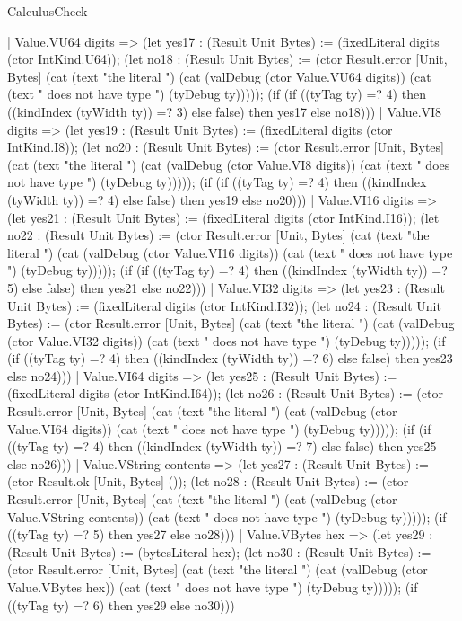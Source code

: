 \begin{lexlean}{CalculusCheck}
\begin{semanticmodule}
{    | Value.VU64 digits => (let yes17 : (Result Unit Bytes) := (fixedLiteral digits (ctor IntKind.U64)); (let no18 : (Result Unit Bytes) := (ctor Result.error [Unit, Bytes] (cat (text "the literal ") (cat (valDebug (ctor Value.VU64 digits)) (cat (text " does not have type ") (tyDebug ty))))); (if (if ((tyTag ty) =? 4) then ((kindIndex (tyWidth ty)) =? 3) else false) then yes17 else no18)))
    | Value.VI8 digits => (let yes19 : (Result Unit Bytes) := (fixedLiteral digits (ctor IntKind.I8)); (let no20 : (Result Unit Bytes) := (ctor Result.error [Unit, Bytes] (cat (text "the literal ") (cat (valDebug (ctor Value.VI8 digits)) (cat (text " does not have type ") (tyDebug ty))))); (if (if ((tyTag ty) =? 4) then ((kindIndex (tyWidth ty)) =? 4) else false) then yes19 else no20)))
    | Value.VI16 digits => (let yes21 : (Result Unit Bytes) := (fixedLiteral digits (ctor IntKind.I16)); (let no22 : (Result Unit Bytes) := (ctor Result.error [Unit, Bytes] (cat (text "the literal ") (cat (valDebug (ctor Value.VI16 digits)) (cat (text " does not have type ") (tyDebug ty))))); (if (if ((tyTag ty) =? 4) then ((kindIndex (tyWidth ty)) =? 5) else false) then yes21 else no22)))
    | Value.VI32 digits => (let yes23 : (Result Unit Bytes) := (fixedLiteral digits (ctor IntKind.I32)); (let no24 : (Result Unit Bytes) := (ctor Result.error [Unit, Bytes] (cat (text "the literal ") (cat (valDebug (ctor Value.VI32 digits)) (cat (text " does not have type ") (tyDebug ty))))); (if (if ((tyTag ty) =? 4) then ((kindIndex (tyWidth ty)) =? 6) else false) then yes23 else no24)))
    | Value.VI64 digits => (let yes25 : (Result Unit Bytes) := (fixedLiteral digits (ctor IntKind.I64)); (let no26 : (Result Unit Bytes) := (ctor Result.error [Unit, Bytes] (cat (text "the literal ") (cat (valDebug (ctor Value.VI64 digits)) (cat (text " does not have type ") (tyDebug ty))))); (if (if ((tyTag ty) =? 4) then ((kindIndex (tyWidth ty)) =? 7) else false) then yes25 else no26)))
    | Value.VString contents => (let yes27 : (Result Unit Bytes) := (ctor Result.ok [Unit, Bytes] ()); (let no28 : (Result Unit Bytes) := (ctor Result.error [Unit, Bytes] (cat (text "the literal ") (cat (valDebug (ctor Value.VString contents)) (cat (text " does not have type ") (tyDebug ty))))); (if ((tyTag ty) =? 5) then yes27 else no28)))
    | Value.VBytes hex => (let yes29 : (Result Unit Bytes) := (bytesLiteral hex); (let no30 : (Result Unit Bytes) := (ctor Result.error [Unit, Bytes] (cat (text "the literal ") (cat (valDebug (ctor Value.VBytes hex)) (cat (text " does not have type ") (tyDebug ty))))); (if ((tyTag ty) =? 6) then yes29 else no30)))
}
\end{semanticmodule}
\end{lexlean}
